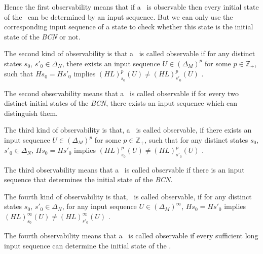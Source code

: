 Hence the first observability means that if a \BCN\ is observable then every initial state of the \BCN\ can be determined by an input sequence. But we can only use the corresponding input sequence of a state to check whether this state is the initial state of the {\em BCN} or not.
\begin{definition}
	The second kind of observability is that a \BCN\ is called observable if for any distinct states $s_0$, ${s'}_0 \in \Delta_N$, there exists an input sequence $U\in(\Delta_M)^p$ for some $p\in \mathbb{Z}_+$, such that $Hs_0=H{s'}_0$ implies $(HL)^p_{s_0}(U)\neq (HL)^p_{{s'}_0}(U)$ \cite{Zhao2010Input}.
\end{definition}

The second observability means that a \BCN\ is called observable if for every two distinct initial states of the {\em BCN}, there exists an input sequence which can distinguish them. 
\begin{definition}
	The third kind of observability is that, a \BCN\ is called observable, if there exists an input sequence $U\in(\Delta_M)^p$ for some $p\in \mathbb{Z}_+$, such that for any distinct states $s_0$, ${s'}_0 \in \Delta_N$, $Hs_0=H{s'}_0$ implies $(HL)^p_{s_0}(U)\neq (HL)^p_{{s'}_0}(U)$ \cite{Cheng2011Identification}.
\end{definition}

The third observability means that a \BCN\ is called observable if there is an input sequence that determines the initial state of the {\em BCN}.
\begin{definition}
	The fourth kind of observability is that, \BCN\ is called observable, if for any distinct states $s_0$, ${s'}_0 \in \Delta_N$, for any input sequence $U\in(\Delta_M)^{\infty}$, $Hs_0=H{s'}_0$ implies $(HL)^{\infty}_{s_0}(U)\neq (HL)^{\infty}_{{s'}_0}(U)$ \cite{Fornasini2013Observability}.
\end{definition}

The fourth observability means that a \BCN\ is called observable if every sufficient long input sequence can determine the initial state of the \BCN.

